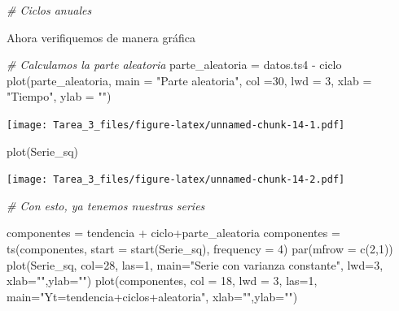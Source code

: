 \documentclass[
]{article}
\newenvironment{Shaded}{\begin{snugshade}}{\end{snugshade}}
\newcommand{\AttributeTok}[1]{\textcolor[rgb]{0.77,0.63,0.00}{#1}}
\newcommand{\CommentTok}[1]{\textcolor[rgb]{0.56,0.35,0.01}{\textit{#1}}}
\newcommand{\DecValTok}[1]{\textcolor[rgb]{0.00,0.00,0.81}{#1}}
\newcommand{\FunctionTok}[1]{\textcolor[rgb]{0.00,0.00,0.00}{#1}}
\newcommand{\NormalTok}[1]{#1}
\newcommand{\OtherTok}[1]{\textcolor[rgb]{0.56,0.35,0.01}{#1}}
\newcommand{\SpecialCharTok}[1]{\textcolor[rgb]{0.00,0.00,0.00}{#1}}
\newcommand{\StringTok}[1]{\textcolor[rgb]{0.31,0.60,0.02}{#1}}
\begin{document}
\begin{Shaded}
\begin{Highlighting}[]
\CommentTok{\# Ciclos anuales}
\end{Highlighting}
\end{Shaded}

Ahora verifiquemos de manera gráfica

\begin{Shaded}
\begin{Highlighting}[]
\CommentTok{\# Calculamos la parte aleatoria}
\NormalTok{parte\_aleatoria }\OtherTok{=}\NormalTok{ datos.ts4 }\SpecialCharTok{{-}}\NormalTok{ ciclo}
\FunctionTok{plot}\NormalTok{(parte\_aleatoria, }\AttributeTok{main =} \StringTok{"Parte aleatoria"}\NormalTok{, }
     \AttributeTok{col =}\DecValTok{30}\NormalTok{, }\AttributeTok{lwd =} \DecValTok{3}\NormalTok{, }\AttributeTok{xlab =} \StringTok{"Tiempo"}\NormalTok{, }\AttributeTok{ylab =} \StringTok{""}\NormalTok{) }
\end{Highlighting}
\end{Shaded}

\texttt{[image: Tarea\_3\_files/figure-latex/unnamed-chunk-14-1.pdf]}

\begin{Shaded}
\begin{Highlighting}[]
\FunctionTok{plot}\NormalTok{(Serie\_sq)}
\end{Highlighting}
\end{Shaded}

\texttt{[image: Tarea\_3\_files/figure-latex/unnamed-chunk-14-2.pdf]}

\begin{Shaded}
\begin{Highlighting}[]
\CommentTok{\# Con esto, ya tenemos nuestras series}

\NormalTok{componentes }\OtherTok{=}\NormalTok{ tendencia }\SpecialCharTok{+}\NormalTok{ ciclo}\SpecialCharTok{+}\NormalTok{parte\_aleatoria}
\NormalTok{componentes }\OtherTok{=} \FunctionTok{ts}\NormalTok{(componentes, }\AttributeTok{start =} \FunctionTok{start}\NormalTok{(Serie\_sq), }\AttributeTok{frequency =} \DecValTok{4}\NormalTok{)}
\FunctionTok{par}\NormalTok{(}\AttributeTok{mfrow =} \FunctionTok{c}\NormalTok{(}\DecValTok{2}\NormalTok{,}\DecValTok{1}\NormalTok{))}
\FunctionTok{plot}\NormalTok{(Serie\_sq, }\AttributeTok{col=}\DecValTok{28}\NormalTok{, }\AttributeTok{las=}\DecValTok{1}\NormalTok{, }\AttributeTok{main=}\StringTok{"Serie con varianza constante"}\NormalTok{, }\AttributeTok{lwd=}\DecValTok{3}\NormalTok{, }\AttributeTok{xlab=}\StringTok{""}\NormalTok{,}\AttributeTok{ylab=}\StringTok{""}\NormalTok{)}
\FunctionTok{plot}\NormalTok{(componentes, }\AttributeTok{col =} \DecValTok{18}\NormalTok{, }\AttributeTok{lwd =} \DecValTok{3}\NormalTok{, }\AttributeTok{las=}\DecValTok{1}\NormalTok{, }\AttributeTok{main=}\StringTok{"Yt=tendencia+ciclos+aleatoria"}\NormalTok{, }\AttributeTok{xlab=}\StringTok{""}\NormalTok{,}\AttributeTok{ylab=}\StringTok{""}\NormalTok{)}
\end{Highlighting}
\end{Shaded}
\end{document}
